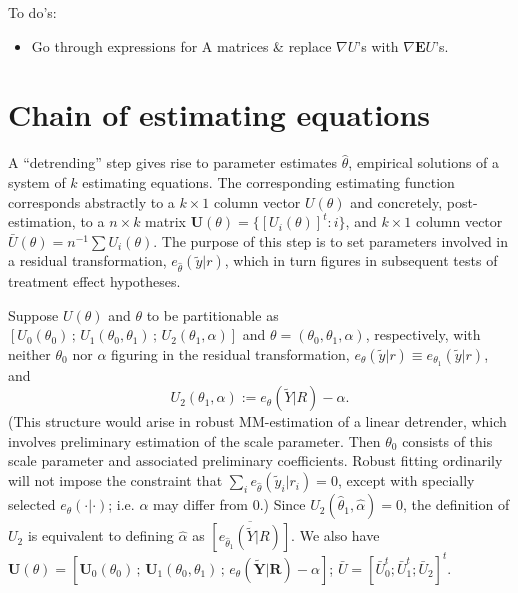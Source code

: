 \documentclass[12pt]{article}
\newcommand{\EE}{\mathbf{E}}
\begin{document}
To do's:
\begin{itemize}
\item Go through expressions for A matrices \& replace $\nabla U$'s
  with $\nabla \EE U$'s. 
\end{itemize}

\section*{Chain of estimating equations}
A ``detrending'' step gives rise to parameter estimates $\hat\theta$, 
empirical solutions of a system of $k$ estimating equations.  The corresponding estimating
function corresponds abstractly to a $k \times 1$ column vector
$U(\theta)$ and concretely, post-estimation, to a $n \times k$ matrix
$\mathbf{U}(\theta) = \{ [U_{i}(\theta)]^{t} : i \}$, and $k \times 1$
column vector $\bar{U}(\theta) = n^{-1} \sum U_{i}(\theta)$. The
purpose of this step is to set parameters involved in a residual
transformation, $e_{\hat{\theta}} (\tilde{y} | r)$, which in turn figures in
subsequent tests of treatment effect hypotheses.

Suppose $U(\theta)$ and $\theta$ to be partitionable as $[U_{0}(\theta_{0}) \, ;\, 
U_{1}(\theta_{0}, \theta_{1})  \, ;\,  U_{2}(\theta_{1}, \alpha)]$ and $\theta =
(\theta_{0}, \theta_{1}, \alpha)$, respectively, with neither
$\theta_{0}$ nor $\alpha$ figuring in the residual transformation, 
 $e_{\theta} (\tilde{y} | r) \equiv e_{\theta_{1}} (\tilde{y} | r)$,
 and 
$$U_{2}(\theta_{1}, \alpha)  := e_{\theta} (\tilde{Y} | R) -
\alpha.$$
 (This structure would arise in robust MM-estimation of a linear detrender, which involves
preliminary estimation of the scale parameter.  Then $\theta_{0}$
consists of this scale parameter and associated preliminary
coefficients.  Robust fitting ordinarily will not impose the constraint
that $\sum_{i} e_{\hat{\theta}} (\tilde{y}_{i} | r_{i}) =0$, except
with specially selected $e_{\theta}(\cdot | \cdot)$; i.e. $\alpha$ may differ from 0.) 
Since $U_{2}(\hat{\theta}_{1}, \hat{\alpha}) = 0$, the definition of
$U_{2}$ is equivalent to defining $\hat\alpha$ as $\overline{[e_{\hat{\theta}_{1}} (\tilde{Y} | R)]}$.
We also have $\mathbf{U}(\theta) = [\mathbf{U}_{0}(\theta_{0})\, ;\, 
\mathbf{U}_{1}(\theta_{0}, \theta_{1}) \, ;\, e_{\theta} (\tilde{\mathbf{Y}} |
\mathbf{R}) - \alpha ]$; $\bar{U} = [\bar{U}_{0}^{t} ;
\bar{U}_{1}^{t};  \bar{U}_{2}]^{t}$. 
\end{document}
